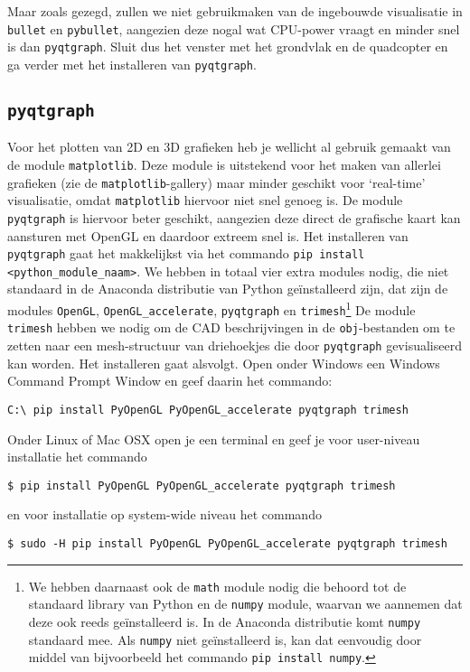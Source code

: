 \documentclass[a4paper,11pt]{article}
\begin{document}
Maar zoals gezegd, zullen we niet gebruikmaken van de ingebouwde visualisatie
in \texttt{bullet} en \texttt{pybullet}, aangezien deze nogal wat CPU-power
vraagt en minder snel is dan \texttt{pyqtgraph}. Sluit dus het venster met het
grondvlak en de quadcopter en ga verder met het installeren van
\texttt{pyqtgraph}.

\subsection{\texttt{pyqtgraph}}
Voor het plotten van 2D en 3D grafieken heb je wellicht al gebruik gemaakt van
de module \texttt{matplotlib}. Deze module is uitstekend voor het maken van
allerlei grafieken (zie de \texttt{matplotlib}-gallery) maar minder geschikt
voor `real-time' visualisatie, omdat \texttt{matplotlib} hiervoor niet snel
genoeg is. De module \texttt{pyqtgraph} is hiervoor beter geschikt, aangezien
deze direct de grafische kaart kan aansturen met OpenGL en daardoor extreem
snel is. Het installeren van \texttt{pyqtgraph} gaat het makkelijkst via het
commando \sloppy \texttt{pip install <python\_module\_naam>}. We hebben in
totaal vier extra modules nodig, die niet standaard in de Anaconda distributie
van Python ge\"installeerd zijn, dat zijn de modules \texttt{OpenGL},
\texttt{OpenGL\_accelerate}, \texttt{pyqtgraph} en
\texttt{trimesh}\footnote{We hebben daarnaast ook de \texttt{math} module
  nodig die behoord tot de standaard library van Python en de \texttt{numpy}
module, waarvan we aannemen dat deze ook reeds ge\"installeerd is. In de
Anaconda distributie komt \texttt{numpy} standaard mee. Als \texttt{numpy}
niet ge\"installeerd is, kan dat eenvoudig door middel van bijvoorbeeld het
commando \texttt{pip install numpy}.} De module \texttt{trimesh} hebben we nodig om de CAD beschrijvingen in de \texttt{obj}-bestanden om te zetten naar een mesh-structuur  van driehoekjes die door \texttt{pyqtgraph} gevisualiseerd kan worden. Het installeren gaat alsvolgt. Open onder Windows een Windows Command Prompt Window en geef daarin het commando:
\begin{verbatim}
C:\ pip install PyOpenGL PyOpenGL_accelerate pyqtgraph trimesh
\end{verbatim} 
Onder Linux of Mac OSX open je een terminal en geef je voor user-niveau installatie het commando
\begin{verbatim}
$ pip install PyOpenGL PyOpenGL_accelerate pyqtgraph trimesh
\end{verbatim} 
en voor installatie op system-wide niveau het commando 
\begin{verbatim}
$ sudo -H pip install PyOpenGL PyOpenGL_accelerate pyqtgraph trimesh
\end{verbatim} 
\end{document}
